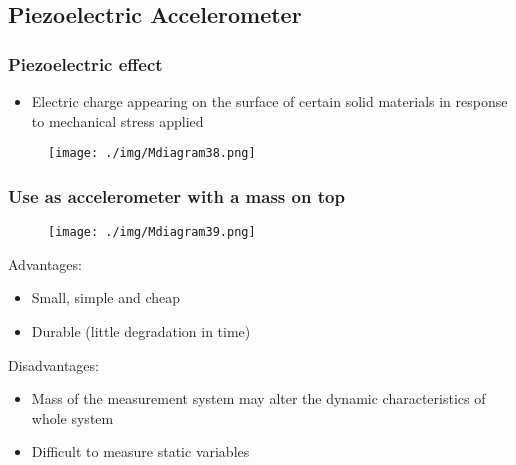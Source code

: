 \subsection{Piezoelectric Accelerometer}
\subsubsection{Piezoelectric effect}
\begin{itemize}
  \item Electric charge appearing on the surface of certain solid materials in response to mechanical stress applied
\end{itemize}
\begin{figure}[H]
  \centering
  \texttt{[image: ./img/Mdiagram38.png]}
\end{figure}
\subsubsection{Use as accelerometer with a mass on top}
\begin{figure}[H]
  \centering
  \texttt{[image: ./img/Mdiagram39.png]}
\end{figure}
Advantages:
\begin{itemize}
  \item Small, simple and cheap
  \item Durable (little degradation in time)
\end{itemize}
Disadvantages:
\begin{itemize}
  \item Mass of the measurement system may alter the dynamic characteristics of whole system
  \item Difficult to measure static variables
\end{itemize}
